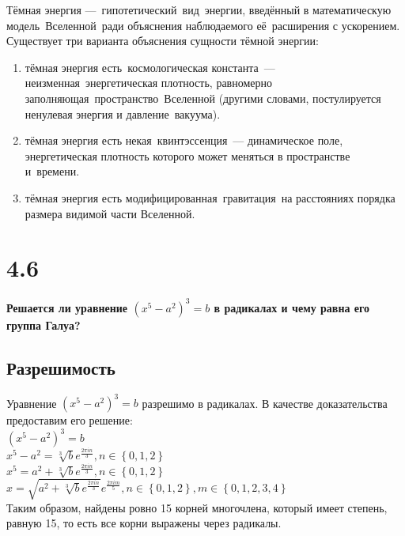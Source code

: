 \documentclass[a4paper,14pt]{article}
\begin{document}
Тёмная энергия — гипотетический вид энергии, введённый в математическую модель Вселенной ради объяснения наблюдаемого её расширения с ускорением.
Существует три варианта объяснения сущности тёмной энергии:
\begin{enumerate}
	\item тёмная энергия есть космологическая константа — неизменная энергетическая плотность, равномерно заполняющая пространство Вселенной (другими словами, постулируется ненулевая энергия и давление вакуума).
	\item тёмная энергия есть некая квинтэссенция — динамическое поле, энергетическая плотность которого может меняться в пространстве и времени.
	\item тёмная энергия есть модифицированная гравитация на расстояниях порядка размера видимой части Вселенной.
\end{enumerate}

\section*{4.6}

\begin{center}
	\LARGE{\textbf{Решается ли уравнение $\left( x^{5}-a^{2}\right) ^{3}=b$ в радикалах и чему равна его группа Галуа?}}\\
\end{center}

\subsection*{Разрешимость}
Уравнение $\left( x^{5}-a^{2}\right) ^{3}=b$ разрешимо в радикалах. В качестве доказательства предоставим его решение:
\\$\left( x^{5}-a^{2}\right) ^{3}=b$
\\$x^{5}-a^{2}=\sqrt [3] {b}e^{\frac {2\pi in}{3}},n\in \left\{ 0,1,2\right\} $
\\$x^{5}=a^{2}+\sqrt [3] {b}e^{\frac {2\pi in}{3}},n\in \left\{ 0,1,2\right\} $
\\$x=\sqrt {a^{2}+\sqrt [3] {b}e^{\frac {2\pi in}{3}}}e^{\frac {2\pi im}{5}},n\in \left\{ 0,1,2\right\} ,m\in \left\{ 0,1,2,3,4\right\} $
\\Таким образом, найдены ровно 15 корней многочлена, который имеет степень, равную 15, то есть все корни выражены через радикалы.
\end{document}

